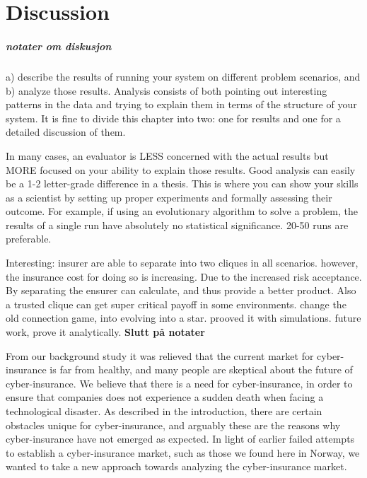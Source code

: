 

\section{Discussion}
\subparagraph{notater om diskusjon}
 a) describe the results of running your system on different problem scenarios, and b) analyze those results. Analysis consists of both pointing out interesting patterns in the data and trying to explain them in terms of the structure of your system.
It is fine to divide this chapter into two: one for results and one for a detailed discussion of them.


In many cases, an evaluator is LESS concerned with the actual results but MORE focused on your ability to explain those results. Good analysis can easily be a 1-2 letter-grade difference in a thesis. This is where you can show your skills as a scientist by setting up proper experiments and formally assessing their outcome. For example, if using an evolutionary algorithm to solve a problem, the results of a single run have absolutely no statistical significance. 20-50 runs are preferable.

Interesting: insurer are able to separate into two cliques in all scenarios. however, the insurance cost for doing so is increasing. Due to the increased risk acceptance. 
By separating the ensurer can calculate, and thus provide a better product. Also a trusted clique can get super critical payoff in some environments. 
change the old connection game, into evolving into a star. prooved it with simulations. future work, prove it analytically.
\textbf{Slutt på notater}



From our background study it was relieved that the current market for cyber-insurance is far from healthy, and many people are skeptical about the future of cyber-insurance. We believe that there is a need for cyber-insurance, in order to ensure that companies does not experience a sudden death when facing a technological disaster. As described in the introduction, there are certain obstacles unique for cyber-insurance, and arguably these are the reasons why cyber-insurance have not emerged as expected. In light of earlier failed attempts to establish a cyber-insurance market, such as those we found here in Norway, we wanted to take a new approach towards analyzing the cyber-insurance market. 


